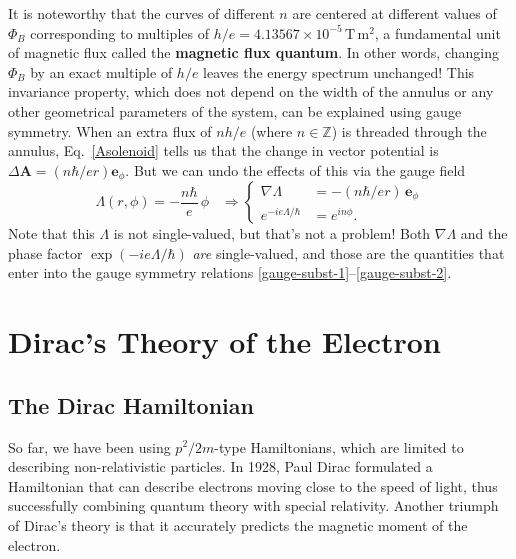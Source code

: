 \documentclass[pra,12pt]{revtex4}
\begin{document}
It is noteworthy that the curves of different $n$ are centered at
different values of $\Phi_B$ corresponding to multiples of $h/e =
4.13567\times10^{-5}\,\mathrm{T}\,\mathrm{m}^2$, a fundamental unit of
magnetic flux called the \textbf{magnetic flux quantum}.  In other
words, changing $\Phi_B$ by an exact multiple of $h/e$ leaves the
energy spectrum unchanged!  This invariance property, which does not
depend on the width of the annulus or any other geometrical parameters
of the system, can be explained using gauge symmetry.  When an extra
flux of $nh/e$ (where $n\in\mathbb{Z}$) is threaded through the
annulus, Eq.~\eqref{Asolenoid} tells us that the change in vector
potential is $\Delta \mathbf{A} = (n\hbar/ e r) \mathbf{e}_\phi$.  But
we can undo the effects of this via the gauge field
\begin{equation}
  \Lambda(r,\phi) = - \frac{n\hbar}{e} \, \phi \;\;\;\Rightarrow
  \begin{cases}\nabla \Lambda &= \displaystyle - (n\hbar/er) \, \mathbf{e}_\phi
    \\ \displaystyle e^{-ie\Lambda/\hbar} &= \displaystyle e^{in\phi}.
  \end{cases}
\end{equation}
Note that this $\Lambda$ is not single-valued, but that's not a
problem!  Both $\nabla\Lambda$ and the phase factor
$\exp(-ie\Lambda/\hbar)$ \textit{are} single-valued, and those are the
quantities that enter into the gauge symmetry relations
\eqref{gauge-subst-1}--\eqref{gauge-subst-2}.

\section{Dirac's Theory of the Electron}

\subsection{The Dirac Hamiltonian}
\label{sec:DiracH}

So far, we have been using $p^2/2m$-type Hamiltonians, which are
limited to describing non-relativistic particles.  In 1928, Paul Dirac
formulated a Hamiltonian that can describe electrons moving close to
the speed of light, thus successfully combining quantum theory with
special relativity. Another triumph of Dirac's theory is that it
accurately predicts the magnetic moment of the electron.
\end{document}
